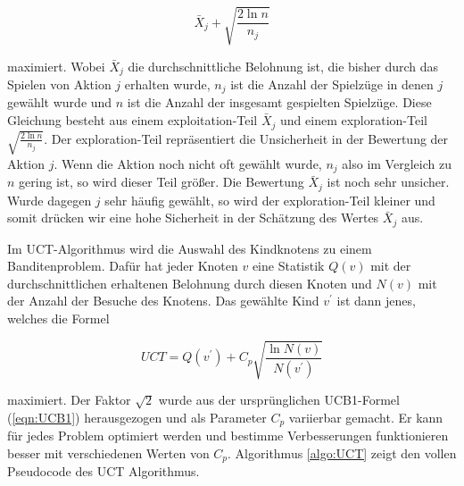 \begin{equation}
\bar{X}_j + \sqrt{\frac{2\ln n}{n_j}}
\label{eqn:UCB1}
\end{equation}

maximiert. Wobei $\bar{X}_j$ die durchschnittliche Belohnung ist, die bisher durch das Spielen von Aktion $j$ erhalten wurde, $n_j$ ist die Anzahl der Spielzüge in denen $j$ gewählt wurde und $n$ ist die Anzahl der insgesamt gespielten Spielzüge. Diese Gleichung besteht aus einem exploitation-Teil $\bar{X}_j$ und einem exploration-Teil $\sqrt{\frac{2\ln n}{n_j}}$. Der exploration-Teil repräsentiert die Unsicherheit in der Bewertung der Aktion $j$. Wenn die Aktion noch nicht oft gewählt wurde, $n_j$ also im Vergleich zu $n$ gering ist, so wird dieser Teil größer. Die Bewertung $\bar{X}_j$ ist noch sehr unsicher. Wurde dagegen $j$ sehr häufig gewählt, so wird der exploration-Teil kleiner und somit drücken wir eine hohe Sicherheit in der Schätzung des Wertes $\bar{X}_j$ aus.

\bigskip
Im UCT-Algorithmus wird die Auswahl des Kindknotens zu einem Banditenproblem. Dafür hat jeder Knoten $v$ eine Statistik $Q(v)$ mit der durchschnittlichen erhaltenen Belohnung durch diesen Knoten und $N(v)$ mit der Anzahl der Besuche des Knotens. Das gewählte Kind $v^\prime$ ist dann jenes, welches die Formel

\begin{equation}
UCT = Q(v^\prime) + C_p\sqrt{\frac{\ln N(v)}{N(v^\prime)}}
\label{eqn:UCT}
\end{equation}

maximiert. Der Faktor $\sqrt{2}$ wurde aus der ursprünglichen UCB1-Formel (\ref{eqn:UCB1}) herausgezogen und als Parameter $C_p$ variierbar gemacht. Er kann für jedes Problem optimiert werden und bestimme Verbesserungen funktionieren besser mit verschiedenen Werten von $C_p$. Algorithmus \ref{algo:UCT} zeigt den vollen Pseudocode des UCT Algorithmus.

